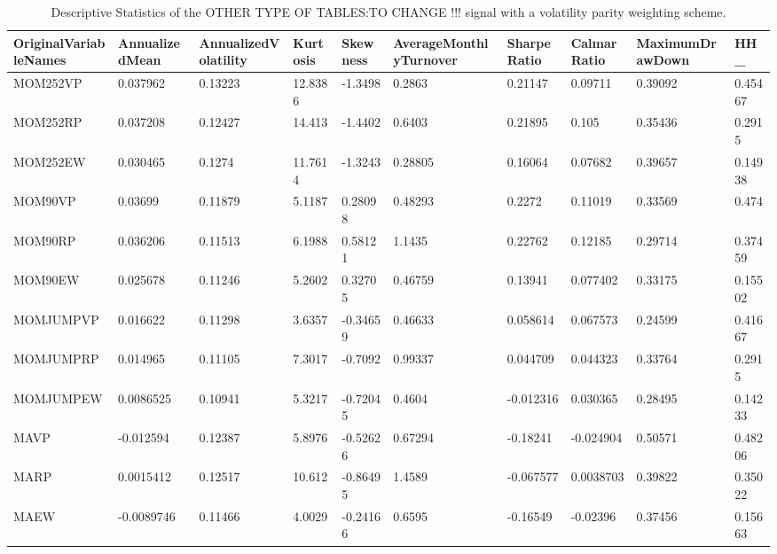 \begin{table}[H]
\centering
\begin{tabular}{llllllllll}
OriginalVariableNames & AnnualizedMean & AnnualizedVolatility & Kurtosis & Skewness & AverageMonthlyTurnover & SharpeRatio & CalmarRatio & MaximumDrawDown & HH_ \\ 
\hline 
MOM252VP & 0.037962 & 0.13223 & 12.8386 & -1.3498 & 0.2863 & 0.21147 & 0.09711 & 0.39092 & 0.45467 \\ 
MOM252RP & 0.037208 & 0.12427 & 14.413 & -1.4402 & 0.6403 & 0.21895 & 0.105 & 0.35436 & 0.2915 \\ 
MOM252EW & 0.030465 & 0.1274 & 11.7614 & -1.3243 & 0.28805 & 0.16064 & 0.07682 & 0.39657 & 0.14938 \\ 
MOM90VP & 0.03699 & 0.11879 & 5.1187 & 0.28098 & 0.48293 & 0.2272 & 0.11019 & 0.33569 & 0.474 \\ 
MOM90RP & 0.036206 & 0.11513 & 6.1988 & 0.58121 & 1.1435 & 0.22762 & 0.12185 & 0.29714 & 0.37459 \\ 
MOM90EW & 0.025678 & 0.11246 & 5.2602 & 0.32705 & 0.46759 & 0.13941 & 0.077402 & 0.33175 & 0.15502 \\ 
MOMJUMPVP & 0.016622 & 0.11298 & 3.6357 & -0.34659 & 0.46633 & 0.058614 & 0.067573 & 0.24599 & 0.41667 \\ 
MOMJUMPRP & 0.014965 & 0.11105 & 7.3017 & -0.7092 & 0.99337 & 0.044709 & 0.044323 & 0.33764 & 0.2915 \\ 
MOMJUMPEW & 0.0086525 & 0.10941 & 5.3217 & -0.72045 & 0.4604 & -0.012316 & 0.030365 & 0.28495 & 0.14233 \\ 
MAVP & -0.012594 & 0.12387 & 5.8976 & -0.52626 & 0.67294 & -0.18241 & -0.024904 & 0.50571 & 0.48206 \\ 
MARP & 0.0015412 & 0.12517 & 10.612 & -0.86495 & 1.4589 & -0.067577 & 0.0038703 & 0.39822 & 0.35022 \\ 
MAEW & -0.0089746 & 0.11466 & 4.0029 & -0.24166 & 0.6595 & -0.16549 & -0.02396 & 0.37456 & 0.15663 \\ 
\hline
\end{tabular}
\caption{Descriptive Statistics of the OTHER TYPE OF TABLES:TO CHANGE !!!  signal with a volatility parity weighting scheme.}
\label{model1}
\end{table}